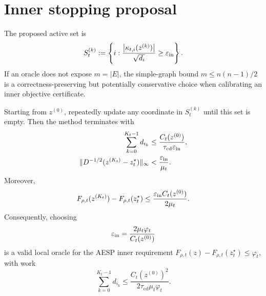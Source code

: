 \section{Inner stopping proposal}

The proposed active set is
\begin{equation}
  S_t^{(k)}
  :=\left\{i:
       \frac{\left\lvert \kappa_{t,i}(z^{(k)}) \right\rvert}{\sqrt{d_i}}
       \geq\varepsilon_{\mathrm{in}}
     \right\}.
  \label{eq:aesp-cd-active-set}
\end{equation}
If an oracle does not expose $m=|E|$, the simple-graph bound
$m\leq n(n-1)/2$ is a correctness-preserving but potentially conservative
choice when calibrating an inner objective certificate.

\begin{theorem}
\label{thm:aesp-cd-inner-work}
Starting from $z^{(0)}$, repeatedly update any coordinate in
$S_t^{(k)}$ until this set is empty.  Then the method terminates with
\begin{align}
 \sum_{k=0}^{K_t-1}d_{i_k}
 &\leq
 \frac{C_t(z^{(0)})}{\tau_{\mathrm{cd}}\varepsilon_{\mathrm{in}}},
 \label{eq:aesp-cd-work}\\
 \lVert D^{-1/2}(z^{(K_t)}-z_t^\star)\rVert_\infty
 &<\frac{\varepsilon_{\mathrm{in}}}{\mu_t}.
 \label{eq:aesp-cd-output-error}
\end{align}
Moreover,
\begin{equation}
 F_{\rho,t}(z^{(K_t)})-F_{\rho,t}(z_t^\star)
 \leq
 \frac{\varepsilon_{\mathrm{in}} C_t(z^{(0)})}{2\mu_t}.
 \label{eq:aesp-cd-output-gap}
\end{equation}
Consequently, choosing
\begin{equation}
 \varepsilon_{\mathrm{in}}=\frac{2\mu_t\varphi_t}{C_t(z^{(0)})}
 \label{eq:aesp-cd-phi-threshold}
\end{equation}
is a valid local oracle for the AESP inner requirement
$F_{\rho,t}(z)-F_{\rho,t}(z_t^\star)\leq\varphi_t$, with work
\begin{equation}
 \sum_{k=0}^{K_t-1}d_{i_k}
 \leq
 \frac{C_t(z^{(0)})^2}
      {2\tau_{\mathrm{cd}}\mu_t\varphi_t}.
 \label{eq:aesp-cd-gap-work}
\end{equation}
\end{theorem}

